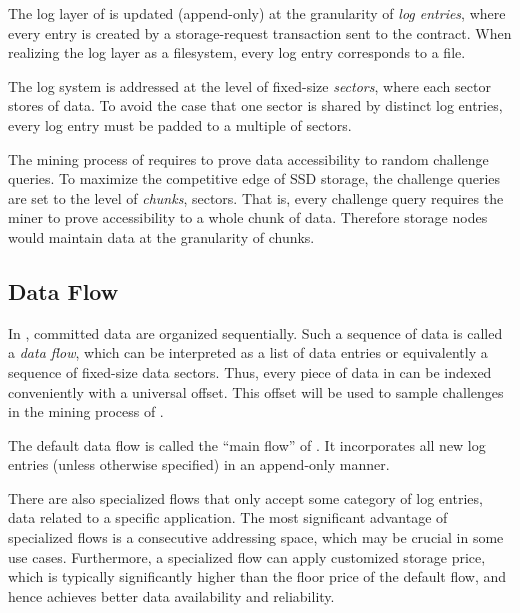 The log layer of \project is updated (append-only) at the granularity of \emph{log entries}, 
where every entry is created by a storage-request transaction sent to the \project contract.
When realizing the log layer as a filesystem, every log entry corresponds to a file.

The log system is addressed at the level of fixed-size \emph{sectors}, where each sector stores \sectorsize of data. 
To avoid the case that one sector is shared by distinct log entries,
every log entry must be padded to a multiple of sectors.

The mining process of \project requires to prove data accessibility to random challenge queries.
To maximize the competitive edge of SSD storage, the challenge queries are set to the level of \chunksize \emph{chunks},  sectors.
That is, every challenge query requires the miner to prove accessibility to a whole chunk of data. 
Therefore storage nodes would maintain data at the granularity of chunks. 

\subsection{Data Flow}
In \project, committed data are organized sequentially.
Such a sequence of data is called a \emph{data flow}, which can be interpreted as a list of data entries or equivalently a sequence of fixed-size data sectors.
Thus, every piece of data in \project can be indexed conveniently with a universal offset.
This offset will be used to sample challenges in the mining process of \sproof.


The default data flow is called the ``main flow'' of \project.
It incorporates all new log entries (unless otherwise specified) in an append-only manner.

There are also specialized flows that only accept some category of log entries,
\eg data related to a specific application.
The most significant advantage of specialized flows is a consecutive addressing space, which may be crucial in some use cases. 
Furthermore, a specialized flow can apply customized storage price, which is typically significantly higher than the floor price of the default flow, and hence achieves better  data availability and reliability.
